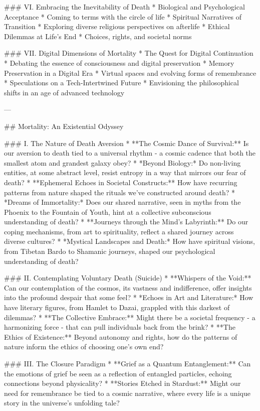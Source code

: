 ### VI. Embracing the Inevitability of Death
   * Biological and Psychological Acceptance
      * Coming to terms with the circle of life
   * Spiritual Narratives of Transition
      * Exploring diverse religious perspectives on afterlife
   * Ethical Dilemmas at Life's End
      * Choices, rights, and societal norms

### VII. Digital Dimensions of Mortality
   * The Quest for Digital Continuation
      * Debating the essence of consciousness and digital preservation
   * Memory Preservation in a Digital Era
      * Virtual spaces and evolving forms of remembrance
   * Speculations on a Tech-Intertwined Future
      * Envisioning the philosophical shifts in an age of advanced technology

---

## Mortality: An Existential Odyssey

### I. The Nature of Death Aversion
   * **The Cosmic Dance of Survival:** Is our aversion to death tied to a universal rhythm - a cosmic cadence that both the smallest atom and grandest galaxy obey?
      * *Beyond Biology:* Do non-living entities, at some abstract level, resist entropy in a way that mirrors our fear of death?
   * **Ephemeral Echoes in Societal Constructs:** How have recurring patterns from nature shaped the rituals we've constructed around death?
      * *Dreams of Immortality:* Does our shared narrative, seen in myths from the Phoenix to the Fountain of Youth, hint at a collective subconscious understanding of death?
   * **Journeys through the Mind's Labyrinth:** Do our coping mechanisms, from art to spirituality, reflect a shared journey across diverse cultures?
      * *Mystical Landscapes and Death:* How have spiritual visions, from Tibetan Bardo to Shamanic journeys, shaped our psychological understanding of death?

### II. Contemplating Voluntary Death (Suicide)
   * **Whispers of the Void:** Can our contemplation of the cosmos, its vastness and indifference, offer insights into the profound despair that some feel?
      * *Echoes in Art and Literature:* How have literary figures, from Hamlet to Dazai, grappled with this darkest of dilemmas?
   * **The Collective Embrace:** Might there be a societal frequency - a harmonizing force - that can pull individuals back from the brink?
   * **The Ethics of Existence:** Beyond autonomy and rights, how do the patterns of nature inform the ethics of choosing one's own end?

### III. The Closure Paradigm
   * **Grief as a Quantum Entanglement:** Can the emotions of grief be seen as a reflection of entangled particles, echoing connections beyond physicality?
   * **Stories Etched in Stardust:** Might our need for remembrance be tied to a cosmic narrative, where every life is a unique story in the universe's unfolding tale?

